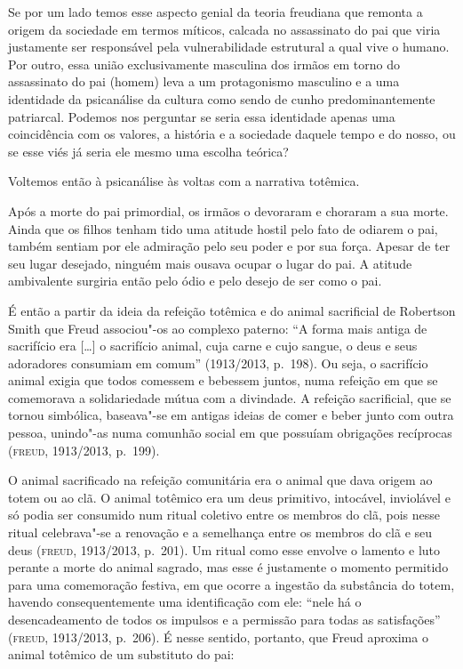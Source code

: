 Se por um lado temos esse aspecto genial da teoria freudiana que remonta
a origem da sociedade em termos míticos, calcada no assassinato do pai
que viria justamente ser responsável pela vulnerabilidade estrutural a
qual vive o humano. Por outro, essa união exclusivamente masculina dos
irmãos em torno do assassinato do pai (homem) leva a um protagonismo
masculino e a uma identidade da psicanálise da cultura como sendo de
cunho predominantemente patriarcal. Podemos nos perguntar se seria essa
identidade apenas uma coincidência com os valores, a história e a
sociedade daquele tempo e do nosso, ou se esse viés já seria ele mesmo
uma escolha teórica?

Voltemos então à psicanálise às voltas com a narrativa totêmica.

Após a morte do pai primordial, os irmãos o devoraram e choraram a sua
morte. Ainda que os filhos tenham tido uma atitude hostil pelo fato de
odiarem o pai, também sentiam por ele admiração pelo seu poder e por sua
força. Apesar de ter seu lugar desejado, ninguém mais ousava ocupar o
lugar do pai. A atitude ambivalente surgiria então pelo ódio e pelo
desejo de ser como o pai.

É então a partir da ideia da refeição totêmica e do animal sacrificial
de Robertson Smith que Freud associou"-os ao complexo paterno: ``A forma
mais antiga de sacrifício era {[}\ldots{}{]} o sacrifício animal, cuja carne
e cujo sangue, o deus e seus adoradores consumiam em comum'' (1913/2013, p.~198). Ou seja, o sacrifício animal exigia que todos comessem e bebessem juntos,
numa refeição em que se comemorava a
solidariedade mútua com a divindade. A refeição sacrificial, que se
tornou simbólica, baseava"-se em antigas ideias de comer e beber
junto com outra pessoa, unindo"-as numa comunhão social em que possuíam
obrigações recíprocas (\textsc{freud}, 1913/2013, p.~199).

O animal sacrificado na refeição comunitária era o animal que dava
origem ao totem ou ao clã. O animal totêmico era um deus primitivo,
intocável, inviolável e só podia ser consumido num ritual coletivo entre
os membros do clã, pois nesse ritual celebrava"-se a renovação e a
semelhança entre os membros do clã e seu deus (\textsc{freud}, 1913/2013, p.~201). Um ritual como esse envolve o lamento e luto perante a morte do
animal sagrado, mas esse é justamente o momento permitido para uma
comemoração festiva, em que ocorre a ingestão da substância do totem,
havendo consequentemente uma identificação com ele: ``nele há o
desencadeamento de todos os impulsos e a permissão para todas as
satisfações'' (\textsc{freud}, 1913/2013, p.~206). É nesse sentido, portanto, que
Freud aproxima o animal totêmico de um substituto do pai:

